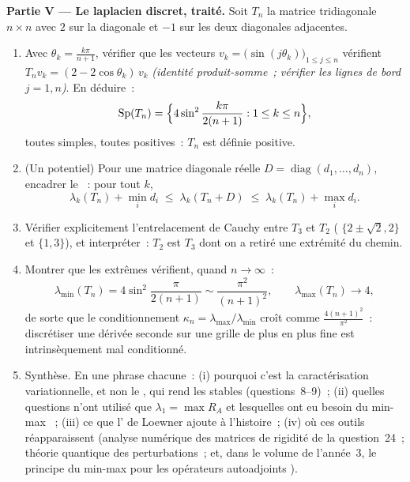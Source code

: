 \begin{problem}
\medskip
\noindent\textbf{Partie V --- Le laplacien discret, traité.}
Soit $T_n$ la matrice tridiagonale $n \times n$ avec $2$ sur
la diagonale et $-1$ sur les deux diagonales adjacentes.
\begin{enumerate}[resume]
  \item Avec $\theta_k = \frac{k\pi}{n+1}$, vérifier que les
        vecteurs $v_k = \bigl(\sin(j\theta_k)\bigr)_{1\leq j\leq
        n}$ vérifient $T_nv_k = (2 - 2\cos\theta_k)\,v_k$
        \emph{(identité produit-somme~; vérifier les lignes de bord
        $j = 1, n$)}. En déduire~:
        \[
        \operatorname{Sp}(T_n) = \Bigl\{4\sin^2
        \frac{k\pi}{2(n+1)} : 1 \leq k \leq n\Bigr\},
        \]
        toutes simples, toutes positives~: $T_n$ est définie positive.
  \item (Un potentiel) Pour une matrice diagonale réelle $D =
        \operatorname{diag}(d_1, \dots, d_n)$, encadrer le
        ~: pour tout $k$,
        \[
        \lambda_k(T_n) + \min_i d_i \;\leq\;
        \lambda_k(T_n + D) \;\leq\; \lambda_k(T_n) + \max_i
        d_i .
        \]
  \item Vérifier explicitement l'entrelacement de Cauchy entre $T_3$
        et $T_2$ ( $\{2 \pm \sqrt2, 2\}$ et $\{1,
        3\}$), et interpréter~: $T_2$ est $T_3$ dont on a retiré une
        extrémité du chemin.
  \item Montrer que les  extrêmes vérifient, quand $n
        \to \infty$~:
        \[
        \lambda_{\min}(T_n) = 4\sin^2\frac{\pi}{2(n+1)}
        \sim \frac{\pi^2}{(n+1)^2},
        \qquad
        \lambda_{\max}(T_n) \to 4 ,
        \]
        de sorte que le conditionnement $\kappa_n =
        \lambda_{\max}/\lambda_{\min}$ croît comme
        $\frac{4(n+1)^2}{\pi^2}$~: discrétiser une dérivée
        seconde sur une grille de plus en plus fine est
        intrinsèquement mal conditionné.
  \item Synthèse. En une phrase chacune~: (i) pourquoi c'est la
        caractérisation variationnelle, et non le , qui rend les  stables
        (questions~8--9)~; (ii) quelles questions n'ont utilisé que
        $\lambda_1 = \max R_A$ et lesquelles ont eu besoin du
        min-max ~; (iii) ce que l' de Loewner ajoute à
        l'histoire~; (iv) où ces outils réapparaissent (analyse
        numérique des matrices de rigidité de la question~24~;
        théorie quantique des perturbations~; et, dans le volume de
        l'année~3, le principe du min-max pour les opérateurs
        autoadjoints ).
\end{enumerate}
\end{problem}
